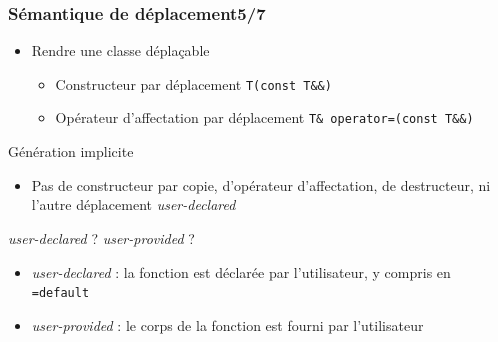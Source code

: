 \documentclass[C++.tex]{subfiles}
\begin{document}
\begin{frame}
	\frametitle{Sémantique de déplacement\titlehfill{}5/7}
	\begin{itemize}
		\item Rendre une classe déplaçable
		\begin{itemize}
			\item Constructeur par déplacement \lstinline|T(const T&&)|
			\item Opérateur d'affectation par déplacement \lstinline|T& operator=(const T&&)|
		\end{itemize}
	\end{itemize}

	\begin{block}{Génération implicite}
		\begin{itemize}
			\item Pas de constructeur par copie, d'opérateur d'affectation, de destructeur, ni l'autre déplacement \textit{user-declared}
		\end{itemize}
	\end{block}
		
	\begin{alertblock}{\textit{user-declared} ? \textit{user-provided} ?}
		\begin{itemize}
			\item \textit{user-declared} : la fonction est déclarée par l'utilisateur, y compris en \lstinline|=default| 
			\item \textit{user-provided} : le corps de la fonction est fourni par l'utilisateur

		\end{itemize}
	\end{alertblock}
\end{frame}
\end{document}
